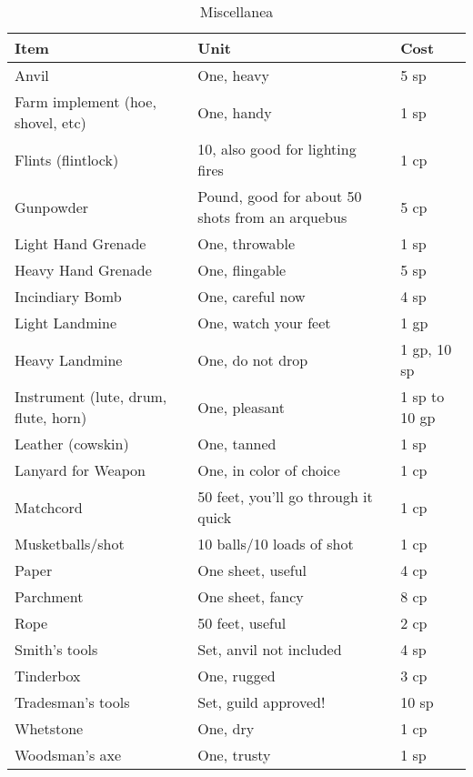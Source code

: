 \documentclass[oneside,11pt,english]{book}
\begin{document}
\begin{table}[hb]
	\centering
	\caption{Miscellanea}
	\label{tab:Miscellanea}
	\begin{tabu} spread 0pt {*{3}{X[-1]}}
		Item &Unit &Cost\\\toprule
Anvil &One, heavy &5 sp\\
Farm implement (hoe, shovel, etc) &One, handy &1 sp\\
Flints (flintlock) &10, also good for lighting fires &1 cp\\
Gunpowder &Pound, good for about 50 shots from an arquebus &5 cp\\
Light Hand Grenade &One, throwable &1 sp\\
Heavy Hand Grenade &One, flingable &5 sp\\
Incindiary Bomb &One, careful now &4 sp\\
Light Landmine &One, watch your feet &1 gp\\
Heavy Landmine &One, do not drop &1 gp, 10 sp\\
Instrument (lute, drum, flute, horn) &One, pleasant &1 sp to 10 gp\\
Leather (cowskin) &One, tanned &1 sp\\
Lanyard for Weapon &One, in color of choice &1 cp\\
Matchcord &50 feet, you’ll go through it quick &1 cp\\
Musketballs/shot &10 balls/10 loads of shot &1 cp\\
Paper &One sheet, useful &4 cp\\
Parchment &One sheet, fancy &8 cp\\
Rope &50 feet, useful &2 cp\\
Smith’s tools &Set, anvil not included &4 sp\\
Tinderbox &One, rugged &3 cp\\
Tradesman’s tools &Set, guild approved! &10 sp\\
Whetstone &One, dry &1 cp\\
Woodsman’s axe &One, trusty &1 sp\\
	\end{tabu}
\end{table}
\clearpage
\end{document}
